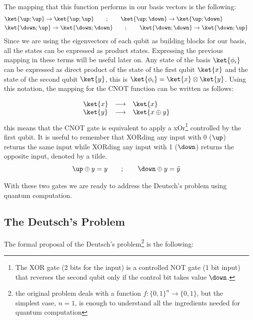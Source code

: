 The mapping that this function performs in our basis vectors is the following:
\begin{equation}
  \begin{split}
    &\ket{\up;\up}\rightarrow\ket{\up;\up} \qquad;\qquad
    \ket{\up;\down}\rightarrow\ket{\up;\down}\\
    &\ket{\down;\up}\rightarrow\ket{\down;\down} \qquad;\qquad
    \ket{\down;\down}\rightarrow\ket{\down;\up}
  \end{split}
\end{equation}
Since we are using the eigenvectors of each qubit as building blocks for our basis, all the states can be expressed as product states. Expressing the previous mapping in these terms will be useful later on.
Any state of the basis $\ket{\phi_i}$ can be expressed as direct product of the state of the first qubit $\ket{x}$ and the state of the second qubit $\ket{y}$, this is  $\ket{\phi_i}=\ket{x}\otimes\ket{y}$.
Using this notation, the mapping for the CNOT function can be written as follows:

\begin{equation}
  \begin{array}{lcl}
    \ket{x} & \longrightarrow & \ket{x} \\
    \ket{y} & \longrightarrow & \ket{x\oplus y}
  \end{array}
\end{equation}
this means that the CNOT gate is equivalent to apply a \ac{xOr}\footnote{The XOR gate (2 bits for the input) is a controlled NOT gate (1 bit input) that reverses the second qubit only if the control bit takes value $\down$.} controlled by the first qubit. It is useful to remember that XORding any input with 0 ($\up$) returns the same input while XORding any input with 1 ($\down$) returns the opposite input, denoted by a tilde.
\begin{equation}
  \up\oplus y = y \qquad;\qquad \down\oplus y = \tilde{y}
\end{equation}

With these two gates we are ready to address the Deutsch's problem using quantum computation.

\subsection{The Deutsch's Problem}
The formal proposal of the Deutsch's problem\footnote{the original problem deals with a function $f:\{ 0,1\}^n\rightarrow\{ 0,1\}$, but the simplest case, $n=1$, is enough to understand all the ingredients needed for quantum computation} is the following:\\


